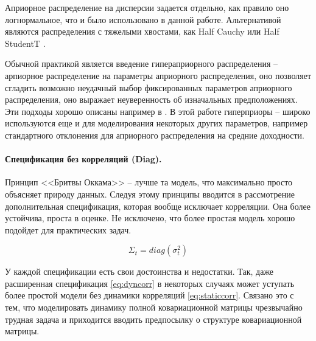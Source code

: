 Априорное распределение на дисперсии задается отдельно, как правило оно логнормальное, что и было использовано в данной работе. Альтернативой являются распределения с тяжелыми хвостами, как Half Cauchy или Half StudentT \citep{gelman2006scale}. 

Обычной практикой является введение гипераприорного распределения -- арпиорное распределение на параметры априорного распределения, оно позволяет сгладить возможно неудачный выбор фиксированных параметров априорного распределения, оно выражает неуверенность об изначальных предположениях. Эти подходы хорошо описаны например в \cite{daniel2014}. В этой работе гиперприоры -- широко используются еще и для моделирования некоторых других параметров, например стандартного отклонения для априорного распределения на средние доходности.

\paragraph{Спецификация без корреляций (Diag).}
Принцип <<Бритвы Оккама>> -- лучше та модель, что максимально просто объясняет природу данных. Следуя этому принципы вводится в рассмотрение дополнительная спецификация, которая вообще исключает корреляции. Она более устойчива, проста в оценке. Не исключено, что более простая модель хорошо подойдет для практических задач.

\begin{equation}
\Sigma_t = diag(\sigma^2_t)\label{eq:nocorr}
\end{equation}

У каждой спецификации есть свои достоинства и недостатки. Так, даже расширенная спецификация \eqref{eq:dyncorr} в некоторых случаях может уступать более простой модели без динамики корреляций \eqref{eq:staticcorr}. Связано это с тем, что моделировать динамику полной ковариационной матрицы чрезвычайно трудная задача и приходится вводить предпосылку о структуре ковариационной матрицы. 

